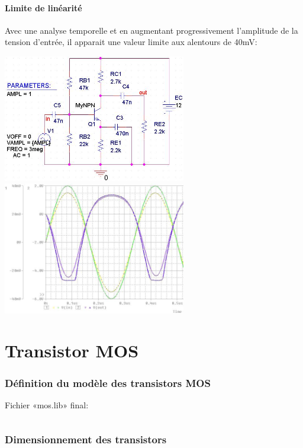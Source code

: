 \documentclass[10pt]{article}
\begin{document}
   \subsection{Limite de linéarité}
    Avec une analyse temporelle et en augmentant progressivement l’amplitude de
    la tension d’entrée, il apparait une valeur limite aux alentours de 40mV:
    \begin{center}
     \includegraphics[width=8cm]{I-II-d_vin-max_circuit.jpg}
     \includegraphics[width=8cm]{I-II-d_vin-max_simu.jpg}
    \end{center}

 \newpage
 \part{Transistor MOS}
  \section{Définition du modèle des transistors MOS}
   Fichier «mos.lib» final:
   \inputminted[linenos]{bash}{mos.lib}

  \section{Dimensionnement des transistors}
\end{document}
